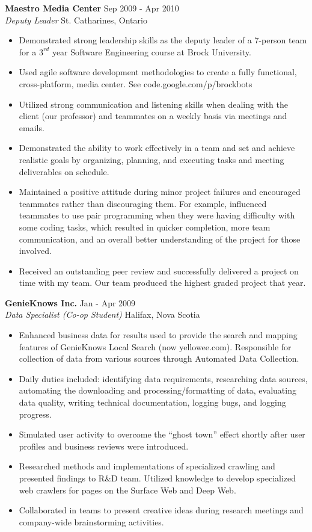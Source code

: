 \documentclass[margin]{res}
\begin{document}
\begin{resume}
	\textbf{Maestro Media Center} \hfill Sep 2009 - Apr 2010 \\
    {\sl Deputy Leader} \hfill St. Catharines, Ontario
	\begin{itemize}  \itemsep -2pt %
	  \item Demonstrated strong leadership skills as the deputy leader of a 7-person team for a $3^{rd}$
	  year Software Engineering course at Brock University.
	  \item Used agile software development methodologies to create a fully functional, cross-platform,
	  media center. See code.google.com/p/brockbots
	  \item Utilized strong communication and listening skills when dealing with the client
	  (our professor) and teammates on a weekly basis via meetings and emails.
	  \item Demonstrated the ability to work effectively in a team and set and achieve realistic
	  goals by organizing, planning, and executing tasks and meeting deliverables on schedule.
	  \item Maintained a positive attitude during minor project failures and encouraged teammates
	  rather than discouraging them. For example, influenced teammates to use pair programming
	  when they were having difficulty with some coding tasks, which resulted in quicker
	  completion, more team communication, and an overall better understanding of the project for
	  those involved.
	  \item Received an outstanding peer review and successfully delivered a project on time with my team.
	  Our team produced the highest graded project that year.
	\end{itemize}

	\textbf{GenieKnows Inc.} \hfill Jan - Apr 2009 \\
    {\sl Data Specialist (Co-op Student)} \hfill Halifax, Nova Scotia
	\begin{itemize}  \itemsep -2pt %
	  \item Enhanced business data for results used to provide the search and mapping features of
	  GenieKnows Local Search (now yellowee.com).
	  Responsible for collection of data from various sources through Automated Data Collection.
	  \item Daily duties included: identifying data requirements,
	  researching data sources, automating the downloading and processing/formatting of data,
	  evaluating data quality, writing technical documentation, logging bugs, and logging progress.
	  \item Simulated user activity to overcome the ``ghost town'' effect shortly after user
	  profiles and business reviews were introduced. %
	  \item Researched methods and implementations of specialized crawling and presented findings
	  to R\&D team.
	  Utilized knowledge to develop specialized web crawlers for pages on the Surface Web and Deep Web.
	  \item Collaborated in teams to present creative ideas during research meetings and company-wide
	  brainstorming activities.
	\end{itemize}


\end{resume}
\end{document}
